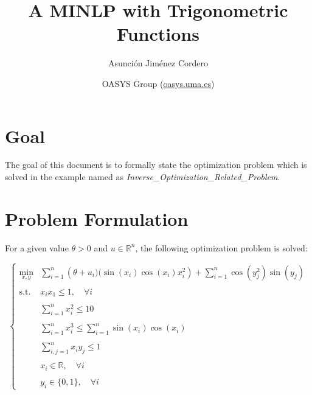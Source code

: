 \documentclass[a4paper,12pt]{article}
\begin{document}
\title{A MINLP with Trigonometric Functions}

\author{Asunci\'on Jim\'enez Cordero}

\date{\small{OASYS Group (\url{oasys.uma.es})}}

\maketitle

\section{Goal}

The goal of this document is to formally state the optimization problem which is solved in the example named as \emph{Inverse\_Optimization\_Related\_Problem}.

\section{Problem Formulation}

For a given value $\theta>0$ and $u\in\mathbb{R}^n$, the following optimization problem is solved:

\begin{equation}
  \left\{
  \begin{array}{cl}
  \min\limits_{x, y} & \sum\limits_{i = 1}^n \left(\theta + u_i)(\sin(x_i)\cos(x_i)x_i^2\right) + \sum\limits_{i = 1}^n \cos(y_j^2)\sin(y_j)\\
  &\\
   \text{s.t. }& x_ix_1\leq 1, \quad \forall i \\
   &\\
   & \sum\limits_{i = 1}^nx_i^2 \leq 10\\
   &\\
   & \sum\limits_{i = 1}^nx_i^3 \leq \sum\limits_{i = 1}^n \sin(x_i)\cos(x_i)\\
   &\\
   & \sum\limits_{i,j = 1}^n x_iy_j \leq 1\\
   &\\
   & x_i \in \mathbb{R}, \quad \forall i\\
   &\\
   & y_i\in\{0,1\}, \quad \forall i
  \end{array}
    \right.
  \end{equation}
\end{document}
